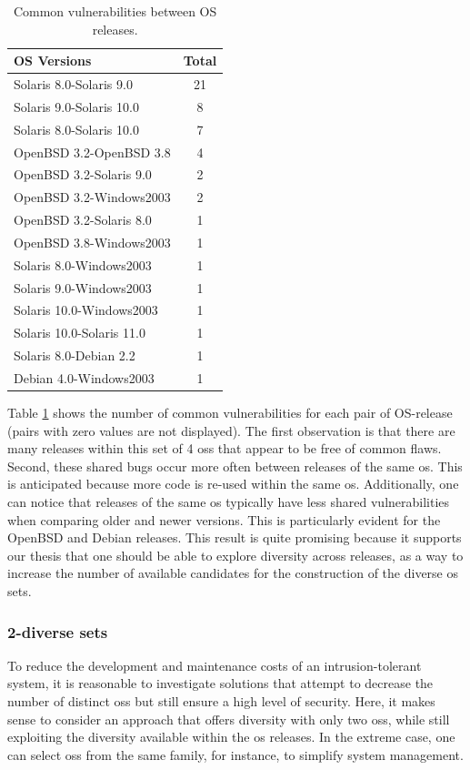\begin{table}[!ht]
\begin{center}
{\scriptsize
\begin{tabular}{|l|c|}\hline
\textbf{OS Versions} & Total  \\\hline\hline
Solaris 8.0-Solaris 9.0 	&21\\
Solaris 9.0-Solaris 10.0 	&8\\
Solaris 8.0-Solaris 10.0 	&7\\
OpenBSD 3.2-OpenBSD 3.8 & 4 \\
OpenBSD 3.2-Solaris 9.0 & 2 \\
OpenBSD 3.2-Windows2003 & 2 \\
OpenBSD 3.2-Solaris 8.0 & 1 \\
OpenBSD 3.8-Windows2003 & 1 \\
Solaris 8.0-Windows2003 & 1 \\
Solaris 9.0-Windows2003 & 1 \\
Solaris 10.0-Windows2003 & 1 \\
Solaris 10.0-Solaris 11.0	& 1 \\
Solaris 8.0-Debian 2.2 &	1 \\
Debian 4.0-Windows2003 & 1 \\\hline
\end{tabular}
\caption{Common vulnerabilities between OS releases.}
\label{tab:vulns_releases}
}
\end{center}
\end{table}

Table \ref{tab:vulns_releases} shows the number of common vulnerabilities for each pair of OS-release (pairs with zero values are not displayed). 
The first observation is that there are many releases within this set of 4 \glspl{os} that appear to be free of common flaws. 
Second, these shared bugs occur more often between releases of the same \gls{os}. 
This is anticipated because more code is re-used within the same \gls{os}.
Additionally, one can notice that releases of the same \gls{os} typically have less shared vulnerabilities when comparing older and newer versions. 
This is particularly evident for the OpenBSD and Debian releases. 
This result is quite promising because it supports our thesis that one should be able to explore diversity across releases, as a way to increase the number of available candidates for the construction of the diverse \gls{os} sets.


\subsubsection*{2-diverse sets} 
To reduce the development and maintenance costs of an intrusion-tolerant system, it is reasonable to investigate solutions that attempt to decrease the number of distinct \glspl{os} but still ensure a high level of security. 
Here, it makes sense to consider an approach that offers diversity with only two \glspl{os}, while still exploiting the diversity available within the \gls{os} releases. 
In the extreme case, one can select \glspl{os} from the same family, for instance, to simplify system management.

